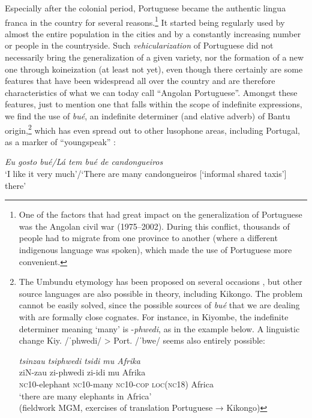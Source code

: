 \documentclass[output=paper,colorlinks,citecolor=brown]{langscibook}
\begin{document}
Especially after the colonial period, Portuguese became the authentic lingua franca in the country for several reasons.\footnote{One of the factors that had great impact on the generalization of Portuguese was the Angolan civil war (1975--2002). During this conflict, thousands of people had to migrate from one province to another (where a different indigenous language was spoken), which made the use of Portuguese more convenient.} It started being regularly used by almost the entire population in the cities and by a constantly increasing number or people in the countryside. Such \textit{vehicularization} of Portuguese did not necessarily bring the generalization of a given variety, nor the formation of a new one through koineization (at least not yet), even though there certainly are some features that have been widespread all over the country and are therefore characteristics of what we can today call “Angolan Portuguese”. Amongst these features, just to mention one that falls within the scope of indefinite expressions, we find the use of \textit{bué}, an indefinite determiner (and elative adverb) of Bantu origin,\footnote{The Umbundu etymology has been proposed on several occasions \citep[cf.][]{SchmidtRadefeldt}, but other source languages are also possible in theory, including Kikongo. The problem cannot be easily solved, since the possible sources of \textit{bué} that we are dealing with are formally close cognates. For instance, in Kiyombe, the indefinite determiner meaning ‘many’ is -\textit{phwedi}, as in the example below. A linguistic change Kiy. /ˈphwedi/ > Port. /ˈbwe/ seems also entirely possible:

\ea
    \textit{tsinzau tsi\textit{phwedi} tsidi mu Afrika}\\
    \gll ziN-zau zi-phwedi zi-idi mu Afrika\\
    \textsc{nc}10-elephant \textsc{nc}10-many \textsc{nc}10-\textsc{cop} \textsc{loc(nc18)} Africa\\
    \glt ‘there are many elephants in Africa’\\
    (fieldwork MGM, exercises of translation Portuguese → Kikongo)
\z} which has even spread out to other lusophone areas, including Portugal, as a marker of “youngspeak” \citep{Almeida2008}:

\ea \label{ex:gut38}
    \textit{Eu gosto bué\slash Lá tem bué de candongueiros}\\
    ‘I like it very much’\slash ‘There are many candongueiros [`informal shared taxis'] there’
\z
\end{document}
